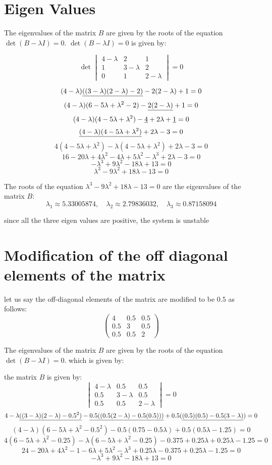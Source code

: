 \documentclass{article}
\begin{document}
\section{Eigen Values}
The eigenvalues of the matrix \(B\) are given by the roots of the equation \(\det(B - \lambda I) = 0\).
\(\det(B - \lambda I) = 0\) is given by:

\[
\det\begin{vmatrix}
4-\lambda & 2 & 1 \\
1 & 3-\lambda & 2 \\
0 & 1 & 2-\lambda
\end{vmatrix} = 0
\]

\[(4-\lambda)\uline{((3-\lambda)(2-\lambda) - 2)} - 2(2-\lambda) + 1  = 0\]
\[(4-\lambda)(6 - 5\lambda + \lambda^2 - 2) - \uline{2(2-\lambda)} + 1 = 0\]
\[(4-\lambda)(4 - 5\lambda + \lambda^2) -\uline{4} + 2\lambda + \uline{1} = 0\]
\[\uline{(4-\lambda)(4 - 5\lambda + \lambda^2)} + 2\lambda - 3 = 0\]
\[4(4 - 5\lambda + \lambda^2) - \lambda(4 - 5\lambda + \lambda^2) + 2\lambda - 3 = 0\]
\[16 - 20\lambda + 4\lambda^2 - 4\lambda + 5\lambda^2 - \lambda^3 + 2\lambda - 3 = 0\]
\[-\lambda^3 + 9\lambda^2 - 18\lambda + 13 = 0\]
\[\lambda^3 - 9\lambda^2 + 18\lambda - 13 = 0\]

The roots of the equation \(\lambda^3 - 9\lambda^2 + 18\lambda - 13 = 0\) are the eigenvalues of the matrix \(B\):
\[\lambda_1 \approx 5.33005874, \quad \lambda_2 \approx 2.79836032, \quad \lambda_3 \approx 0.87158094\]

since all the three eigen values are positive, the system is unstable

\section{Modification of the off diagonal elements of the matrix}

let us say the off-diagonal elements of the matrix are modified to be \(0.5\) as follows:
\[\begin{pmatrix}
4 & 0.5 & 0.5 \\
0.5 & 3 & 0.5 \\
0.5 & 0.5 & 2
\end{pmatrix}\]

The eigenvalues of the matrix \(B\) are given by the roots of the equation \(\det(B - \lambda I) = 0\). which is given by:

the matrix \(B\) is given by:
\[\begin{vmatrix}
4-\lambda & 0.5 & 0.5 \\
0.5 & 3-\lambda & 0.5 \\
0.5 & 0.5 & 2-\lambda
\end{vmatrix} = 0\]
\[4-\lambda\uline{((3-\lambda)(2-\lambda) - 0.5^2)} - \uline{0.5((0.5(2-\lambda) - 0.5(0.5)))} + 0.5(\uline{(0.5)(0.5)-0.5(3-\lambda)}) = 0\]
\[(4-\lambda)(6 - 5\lambda + \lambda^2 - 0.5^2) - 0.5(0.75-0.5\lambda) + 0.5(0.5\lambda -1.25) = 0\]
\[4(6 - 5\lambda + \lambda^2 - 0.25) -\lambda(6-5\lambda + \lambda^2 - 0.25) - 0.375 + 0.25\lambda + 0.25\lambda - 1.25 = 0\]
\[24 - 20\lambda + 4\lambda^2 - 1 - 6\lambda + 5\lambda^2 - \lambda^3 + 0.25\lambda - 0.375 + 0.25\lambda - 1.25 = 0\]
\[-\lambda^3 + 9\lambda^2 - 18\lambda + 13 = 0\]
\end{document}
